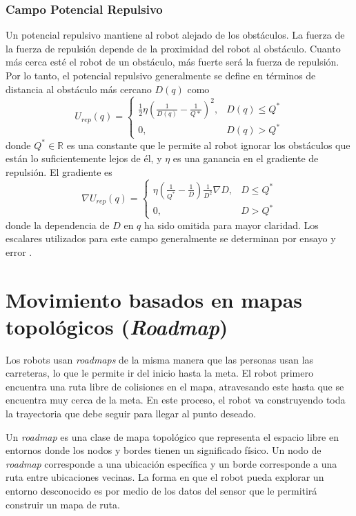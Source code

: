 \subsubsection{Campo Potencial Repulsivo}
Un potencial repulsivo mantiene al robot alejado de los obst\'aculos. La fuerza de la fuerza de repulsi\'on depende de la proximidad del robot al obst\'aculo. Cuanto m\'as cerca est\'e el robot de un obst\'aculo, m\'as fuerte ser\'a la fuerza de repulsi\'on. Por lo tanto, el potencial repulsivo generalmente se define en t\'erminos de distancia al obst\'aculo m\'as cercano $D(q)$ como 
\begin{equation}
U_{rep}(q) =
\begin{cases}
	\frac{1}{2}\eta(\frac{1}{D(q)} - \frac{1}{Q*})^2, & D(q)\leq Q^* \\
	0, & D(q) > Q^*
\end{cases}
\label{eq:pot_rep}
\end{equation}
donde $Q^* \in \mathbb R$ es una constante que le permite al robot ignorar los obst\'aculos que est\'an lo suficientemente lejos de \'el, y $\eta$ es una ganancia en el gradiente de repulsi\'on. El gradiente es 
\begin{equation}
\nabla U_{rep}(q) =
\begin{cases}
	\eta(\frac{1}{Q^*} - \frac{1}{D})\frac{1}{D^2} \nabla D, & D \leq Q^* \\
	0, & D > Q^*
\end{cases}
\label{eqn:gradient_rep}
\end{equation}
donde la dependencia de $D$ en $q$ ha sido omitida para mayor claridad. Los escalares utilizados para este campo generalmente se determinan por ensayo y error \cite{choset2005principles}.

\section{Movimiento basados en mapas topol\'ogicos (\textit{Roadmap})}

Los robots usan \textit{roadmaps} de la misma manera que las personas usan las carreteras, lo que le permite ir del inicio hasta la meta. El robot primero encuentra una ruta libre de colisiones en el mapa, atravesando este hasta que se encuentra muy cerca de la meta. En este proceso, el robot va construyendo toda la trayectoria que debe seguir para llegar al punto deseado. 

Un \textit{roadmap} es una clase de mapa topol\'ogico que representa el espacio libre en entornos \cite{choset2005RoadMap} donde los nodos y bordes tienen un significado f\'isico. Un nodo de \textit{roadmap} corresponde a una ubicaci\'on espec\'ifica y un borde corresponde a una ruta entre ubicaciones vecinas. La forma en que el robot pueda explorar un entorno desconocido es por medio de los datos del sensor que le permitir\'a construir un mapa de ruta.

